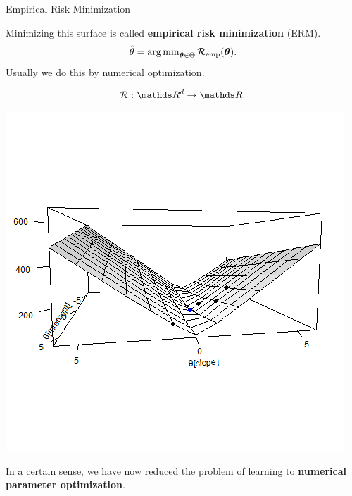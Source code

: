 \documentclass[11pt,compress,t,notes=noshow, xcolor=table]{beamer}
\begin{document}
\begin{vbframe}{Empirical Risk Minimization}
\framebreak

Minimizing this surface is called \textbf{empirical risk minimization} (ERM).
$$
\hat{\theta} = \operatorname{arg\,min}_{\bm{\theta} \in \Theta} \mathcal{R}_{\text{emp}}(\bm{\theta}).
$$
Usually we do this by numerical optimization.

\begin{table}
\begin{minipage}{0.4\linewidth}
$$\risk : \R^d \to \R.$$
\end{minipage}\hfill
	\begin{minipage}{0.55\linewidth}
\includegraphics[trim=0 100 0 100,clip,width=\textwidth]{figure/ml-basic-riskmin-error-surface-best.png}
\end{minipage}
\end{table}

In a certain sense, we have now reduced the problem of learning to
\textbf{numerical parameter optimization}.

\end{vbframe}
\end{document}
